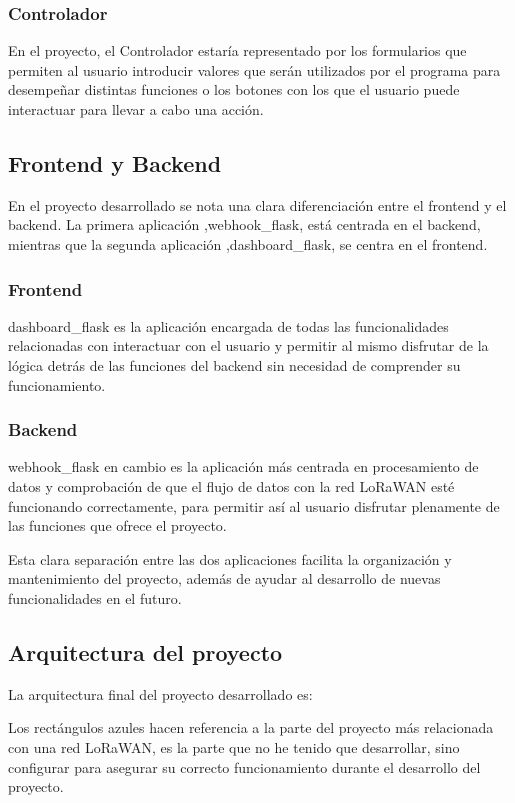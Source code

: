 \subsubsection{Controlador}
En el proyecto, el Controlador estaría representado por los formularios que permiten al usuario introducir valores que serán utilizados por el programa para desempeñar distintas funciones o los botones con los que el usuario puede interactuar para llevar a cabo una acción.

\subsection{Frontend y Backend}

En el proyecto desarrollado se nota una clara diferenciación entre el frontend y el backend. La primera aplicación ,webhook\_flask, está centrada en el backend, mientras que la segunda aplicación ,dashboard\_flask, se centra en el frontend.

\subsubsection{Frontend}
dashboard\_flask es la aplicación encargada de todas las funcionalidades relacionadas con interactuar con el usuario y permitir al mismo disfrutar de la lógica detrás de las funciones del backend sin necesidad de comprender su funcionamiento.

\subsubsection{Backend}
webhook\_flask en cambio es la aplicación más centrada en procesamiento de datos y comprobación de que el flujo de datos con la red LoRaWAN esté funcionando correctamente, para permitir así al usuario disfrutar plenamente de las funciones que ofrece el proyecto.

Esta clara separación entre las dos aplicaciones facilita la organización y mantenimiento del proyecto, además de ayudar al desarrollo de nuevas funcionalidades en el futuro.


\subsection{Arquitectura del proyecto}
La arquitectura final del proyecto desarrollado es:


Los rectángulos azules hacen referencia a la parte del proyecto más relacionada con una red LoRaWAN, es la parte que no he tenido que desarrollar, sino configurar para asegurar su correcto funcionamiento durante el desarrollo del proyecto.

